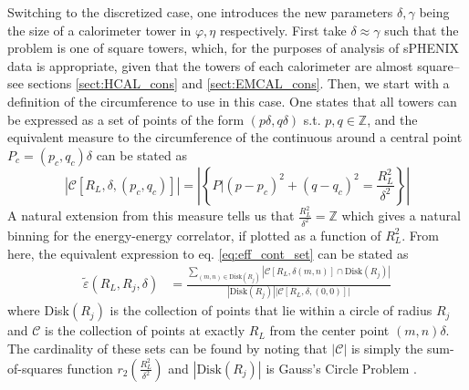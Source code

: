 	\hspace{0.5 cm} Switching to the discretized case, one introduces the new parameters $\delta, \gamma$ being the size of a calorimeter tower in $\varphi, \eta$ respectively. First take $\delta \approx \gamma$ such that the problem is one of square towers, which, for the purposes of analysis of sPHENIX data is appropriate, given that the towers of each calorimeter are almost square--see sections \ref{sect:HCAL_cons} and \ref{sect:EMCAL_cons}. 
	Then, we start with a definition of the circumference to use in this case. 
	One states that all towers can be expressed as a set of points of the form $(p \delta , q \delta)$ s.t. $p, q \in \mathbb{Z}$, and the equivalent measure to the circumference of the continuous around a central point $P_c=(p_c, q_c)\delta$ can be stated as 
	\begin{equation}
		\left|\mathcal{C}\left[R_L, \delta,\left(p_c, q_c\right)\right]\right| = \left| \left\{ P | \left(p - p_c\right)^2 + \left(q-q_c\right)^2 = \frac{R_L^2}{\delta^2} \right\}\right|
		\label{eq:N_pairs_disc}
	\end{equation}
	A natural extension from this measure tells us that $\frac{R_L^2}{\delta^2} = \mathbb{Z}$ which gives a natural binning for the energy-energy correlator, if plotted as a function of $R_L^2$. 
	From here, the equivalent expression to eq. \ref{eq:eff_cont_set} can be stated as 
	\begin{equation}
		\begin{split}
			\tilde{\varepsilon} \left(R_L, R_j, \delta \right) &= \frac{ \sum_{(m,n) \in \textrm{Disk}\left(R_j\right)} \left| \mathcal{C} \left[R_L, \delta \left( m, n\right)\right] \cap \textrm{Disk} \left( R_j \right) \right|}{\left| \textrm{Disk}\left(R_j\right)\right| \left|\mathcal{C}\left[R_L, \delta,\left(0, 0\right)\right]\right|}
		\end{split}
		\label{eq:eff_disc_set}
	\end{equation}
	where Disk$\left(R_j\right)$ is the collection of points that lie within a circle of radius $R_j$ and $\mathcal{C}$ is the collection of points at exactly $R_L$ from the center point $(m,n)\delta$. 
	The cardinality of these sets can be found by noting that $|\mathcal{C}|$ is simply the sum-of-squares function $r_2\left( \frac{R_L^2}{\delta^2} \right)$ and $\left| \textrm{Disk}\left(R_j\right)\right|$ is Gauss's Circle Problem \cite{Hilbert2021}. 

